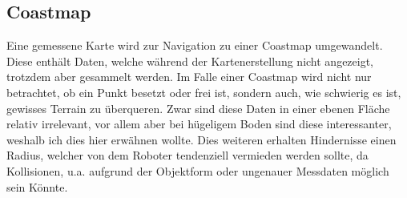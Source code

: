 {{		\subsection{Coastmap}
		{
			Eine gemessene Karte wird zur Navigation zu einer Coastmap umgewandelt. Diese enthält Daten, welche während  der Kartenerstellung nicht angezeigt, trotzdem aber gesammelt werden. Im Falle einer Coastmap wird nicht nur betrachtet, ob ein Punkt besetzt oder frei ist, sondern auch, wie schwierig es ist, gewisses Terrain zu überqueren. Zwar sind diese Daten in einer ebenen Fläche relativ irrelevant, vor allem aber bei hügeligem Boden sind diese interessanter, weshalb ich dies hier erwähnen wollte. Dies weiteren erhalten Hindernisse einen Radius, welcher von dem Roboter tendenziell vermieden werden sollte, da Kollisionen, u.a. aufgrund der Objektform oder ungenauer Messdaten möglich sein Könnte.
		}
		
}}
